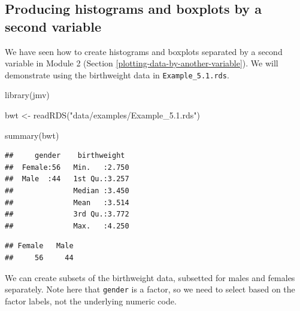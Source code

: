 \documentclass[
]{memoir}
\newenvironment{Shaded}{\begin{snugshade}}{\end{snugshade}}
\newcommand{\FunctionTok}[1]{\textcolor[rgb]{0.00,0.00,0.00}{#1}}
\newcommand{\NormalTok}[1]{#1}
\newcommand{\OtherTok}[1]{\textcolor[rgb]{0.56,0.35,0.01}{#1}}
\newcommand{\SpecialCharTok}[1]{\textcolor[rgb]{0.00,0.00,0.00}{#1}}
\newcommand{\StringTok}[1]{\textcolor[rgb]{0.31,0.60,0.02}{#1}}
\begin{document}
\hypertarget{producing-histograms-and-boxplots-by-a-second-variable}{%
\subsection{Producing histograms and boxplots by a second variable}\label{producing-histograms-and-boxplots-by-a-second-variable}}

We have seen how to create histograms and boxplots separated by a second variable in Module 2 (Section \ref{plotting-data-by-another-variable}). We will demonstrate using the birthweight data in \texttt{Example\_5.1.rds}.

\begin{Shaded}
\begin{Highlighting}[]
\FunctionTok{library}\NormalTok{(jmv)}

\NormalTok{bwt }\OtherTok{\textless{}{-}} \FunctionTok{readRDS}\NormalTok{(}\StringTok{"data/examples/Example\_5.1.rds"}\NormalTok{)}

\FunctionTok{summary}\NormalTok{(bwt)}
\end{Highlighting}
\end{Shaded}

\begin{verbatim}
##     gender    birthweight   
##  Female:56   Min.   :2.750  
##  Male  :44   1st Qu.:3.257  
##              Median :3.450  
##              Mean   :3.514  
##              3rd Qu.:3.772  
##              Max.   :4.250
\end{verbatim}

\begin{Shaded}
\end{Shaded}

\begin{verbatim}
## Female   Male 
##     56     44
\end{verbatim}

We can create subsets of the birthweight data, subsetted for males and females separately. Note here that \texttt{gender} is a factor, so we need to select based on the factor labels, not the underlying numeric code.

\begin{Shaded}
\end{Shaded}
\end{document}
